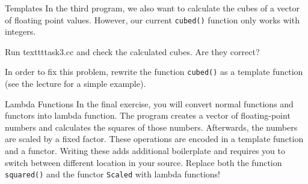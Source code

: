 \documentclass[12pt,a4paper]{article}
\begin{document}
\begin{Exercise}{Templates}
In the third program, we also want to calculate the cubes of a vector of floating point values. However,
our current \texttt{cubed()} function only works with integers.

Run texttt{task3.cc} and check the calculated cubes. Are they correct?

In order to fix this problem, rewrite the function \texttt{cubed()} as a template function (see the lecture
for a simple example).

\end{Exercise}

\begin{Exercise}{Lambda Functions}
In the final exercise, you will convert normal functions and functors into lambda function. The program creates a vector of floating-point numbers and calculates the squares of those numbers. Afterwards, the numbers are scaled by a fixed factor. These operations are encoded in a template function and a functor. Writing these adds additional boilerplate and requires you to switch between different location in your source. Replace both the function \texttt{squared()} and the functor \texttt{Scaled} with lambda functions!
\end{Exercise}
\end{document}
